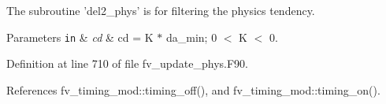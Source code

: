 The subroutine 'del2\-\_\-phys' is for filtering the physics tendency. 


\begin{DoxyParams}[1]{Parameters}
\mbox{\tt in}  & {\em cd} & cd = K $\ast$ da\-\_\-min; 0 $<$ K $<$ 0. \\
\hline
\end{DoxyParams}


Definition at line 710 of file fv\-\_\-update\-\_\-phys.\-F90.



References fv\-\_\-timing\-\_\-mod\-::timing\-\_\-off(), and fv\-\_\-timing\-\_\-mod\-::timing\-\_\-on().

